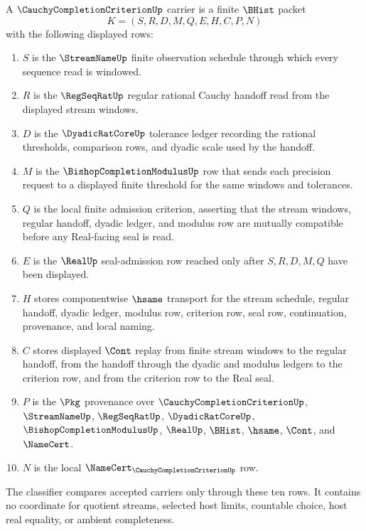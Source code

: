 \begin{definition}
\label{def:cauchy-completion-criterion-carrier}
A $\CauchyCompletionCriterionUp$ carrier is a finite $\BHist$ packet
$$
K=(S,R,D,M,Q,E,H,C,P,N)
$$
with the following displayed rows:
\begin{enumerate}
\item $S$ is the $\StreamNameUp$ finite observation schedule through which every sequence read is windowed.
\item $R$ is the $\RegSeqRatUp$ regular rational Cauchy handoff read from the displayed stream windows.
\item $D$ is the $\DyadicRatCoreUp$ tolerance ledger recording the rational thresholds, comparison rows, and dyadic scale used by the handoff.
\item $M$ is the $\BishopCompletionModulusUp$ row that sends each precision request to a displayed finite threshold for the same windows and tolerances.
\item $Q$ is the local finite admission criterion, asserting that the stream windows, regular handoff, dyadic ledger, and modulus row are mutually compatible before any Real-facing seal is read.
\item $E$ is the $\RealUp$ seal-admission row reached only after $S,R,D,M,Q$ have been displayed.
\item $H$ stores componentwise $\hsame$ transport for the stream schedule, regular handoff, dyadic ledger, modulus row, criterion row, seal row, continuation, provenance, and local naming.
\item $C$ stores displayed $\Cont$ replay from finite stream windows to the regular handoff, from the handoff through the dyadic and modulus ledgers to the criterion row, and from the criterion row to the Real seal.
\item $P$ is the $\Pkg$ provenance over $\CauchyCompletionCriterionUp$, $\StreamNameUp$, $\RegSeqRatUp$, $\DyadicRatCoreUp$, $\BishopCompletionModulusUp$, $\RealUp$, $\BHist$, $\hsame$, $\Cont$, and $\NameCert$.
\item $N$ is the local $\NameCert_{\CauchyCompletionCriterionUp}$ row.
\end{enumerate}
The classifier compares accepted carriers only through these ten rows. It contains no coordinate for quotient streams, selected host limits, countable choice, host real equality, or ambient completeness.
\end{definition}

